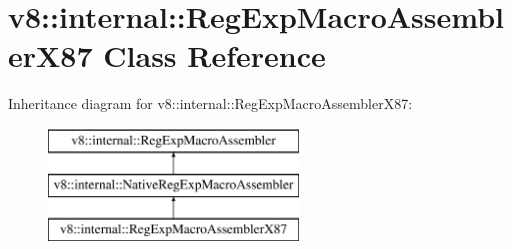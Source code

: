\hypertarget{classv8_1_1internal_1_1_reg_exp_macro_assembler_x87}{}\section{v8\+:\+:internal\+:\+:Reg\+Exp\+Macro\+Assembler\+X87 Class Reference}
\label{classv8_1_1internal_1_1_reg_exp_macro_assembler_x87}
Inheritance diagram for v8\+:\+:internal\+:\+:Reg\+Exp\+Macro\+Assembler\+X87\+:\begin{figure}[H]
\begin{center}
\leavevmode
\includegraphics[height=3.000000cm]{classv8_1_1internal_1_1_reg_exp_macro_assembler_x87}
\end{center}
\end{figure}
